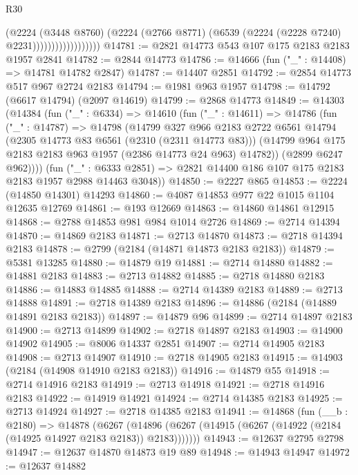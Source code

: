 \begin{lexlean}{R30}
\begin{coremodule}
                                (@2224
                                  (@3448 @8760)
                                  (@2224
                                    (@2766 @8771)
                                    (@6539 (@2224 (@2228 @7240) @2231))))))))))))))))))
@14781 := @2821 @14773 @543 @107 @175 @2183 @2183 @1957 @2841
@14782 := @2844 @14773
@14786 := @14666 (fun ("_" : @14408) => @14781 @14782 @2847)
@14787 := @14407 @2851
@14792 := @2854 @14773 @517 @967 @2724 @2183
@14794 := @1981 @963 @1957
@14798 := @14792 (@6617 @14794) (@2097 @14619)
@14799 := @2868 @14773
@14849 := @14303
    (@14384
      (fun ("_" : @6334) =>
      @14610
        (fun ("_" : @14611) =>
        @14786
          (fun ("_" : @14787) =>
          @14798
            (@14799
              @327
              @966
              @2183
              @2722
              @6561
              @14794
              (@2305 @14773 @83 @6561 (@2310 (@2311 @14773 @83)))
              (@14799 @964 @175 @2183 @2183 @963 @1957 (@2386 @14773 @24 @963) @14782))
            (@2899 @6247 @962))))
      (fun ("_" : @6333 @2851) => @2821 @14400 @186 @107 @175 @2183 @2183 @1957 @2988 @14463 @3048))
@14850 := @2227 @865
@14853 := @2224 (@14850 @14301) @14293
@14860 := @4087 @14853 @977 @22 @1015 @1104 @12635 @12769
@14861 := @193 @12669
@14863 := @14860 @14861 @12915
@14868 := @2788 @14853 @981 @984 @1014 @2726
@14869 := @2714 @14394
@14870 := @14869 @2183
@14871 := @2713 @14870
@14873 := @2718 @14394 @2183
@14878 := @2799 (@2184 (@14871 @14873 @2183 @2183))
@14879 := @5381 @13285
@14880 := @14879 @19
@14881 := @2714 @14880
@14882 := @14881 @2183
@14883 := @2713 @14882
@14885 := @2718 @14880 @2183
@14886 := @14883 @14885
@14888 := @2714 @14389 @2183
@14889 := @2713 @14888
@14891 := @2718 @14389 @2183
@14896 := @14886 (@2184 (@14889 @14891 @2183 @2183))
@14897 := @14879 @96
@14899 := @2714 @14897 @2183
@14900 := @2713 @14899
@14902 := @2718 @14897 @2183
@14903 := @14900 @14902
@14905 := @8006 @14337 @2851
@14907 := @2714 @14905 @2183
@14908 := @2713 @14907
@14910 := @2718 @14905 @2183
@14915 := @14903 (@2184 (@14908 @14910 @2183 @2183))
@14916 := @14879 @55
@14918 := @2714 @14916 @2183
@14919 := @2713 @14918
@14921 := @2718 @14916 @2183
@14922 := @14919 @14921
@14924 := @2714 @14385 @2183
@14925 := @2713 @14924
@14927 := @2718 @14385 @2183
@14941 := @14868
    (fun (__b : @2180) =>
    @14878
      (@6267 (@14896 (@6267 (@14915 (@6267 (@14922 (@2184 (@14925 @14927 @2183 @2183)) @2183)))))))
@14943 := @12637 @2795 @2798
@14947 := @12637 @14870 @14873 @19 @89
@14948 := @14943 @14947
@14972 := @12637
    @14882

\end{coremodule}
\end{lexlean}
